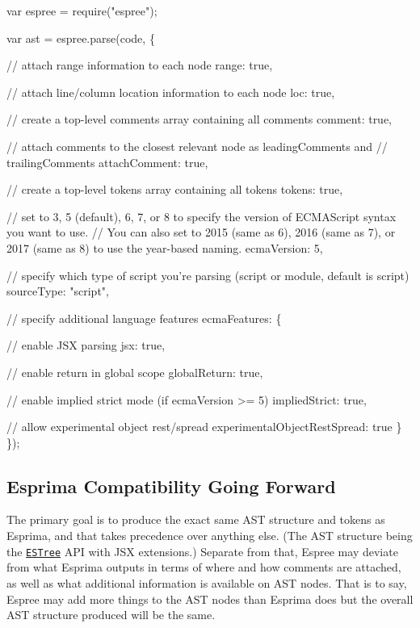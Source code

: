 \begin{DoxyCode}
var espree = require("espree");

var ast = espree.parse(code, \{

    // attach range information to each node
    range: true,

    // attach line/column location information to each node
    loc: true,

    // create a top-level comments array containing all comments
    comment: true,

    // attach comments to the closest relevant node as leadingComments and
    // trailingComments
    attachComment: true,

    // create a top-level tokens array containing all tokens
    tokens: true,

    // set to 3, 5 (default), 6, 7, or 8 to specify the version of ECMAScript syntax you want to use. 
    // You can also set to 2015 (same as 6), 2016 (same as 7), or 2017 (same as 8) to use the year-based
       naming.
    ecmaVersion: 5,

    // specify which type of script you're parsing (script or module, default is script)
    sourceType: "script",

    // specify additional language features
    ecmaFeatures: \{

        // enable JSX parsing
        jsx: true,

        // enable return in global scope
        globalReturn: true,

        // enable implied strict mode (if ecmaVersion >= 5)
        impliedStrict: true,

        // allow experimental object rest/spread
        experimentalObjectRestSpread: true
    \}
\});
\end{DoxyCode}


\subsection*{Esprima Compatibility Going Forward}

The primary goal is to produce the exact same A\+ST structure and tokens as Esprima, and that takes precedence over anything else. (The A\+ST structure being the \href{https://github.com/estree/estree}{\tt E\+S\+Tree} A\+PI with J\+SX extensions.) Separate from that, Espree may deviate from what Esprima outputs in terms of where and how comments are attached, as well as what additional information is available on A\+ST nodes. That is to say, Espree may add more things to the A\+ST nodes than Esprima does but the overall A\+ST structure produced will be the same.

